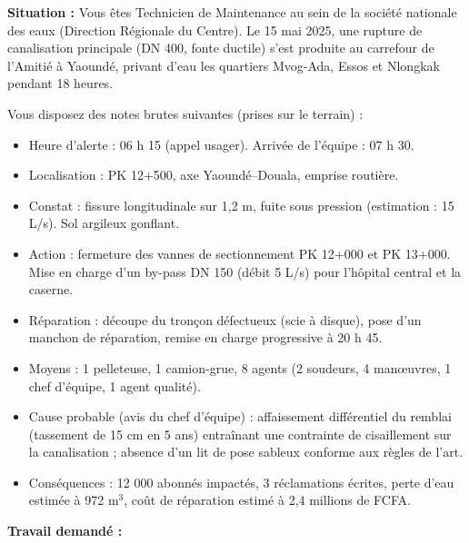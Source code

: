 \documentclass[11pt]{article}
\begin{document}
\begin{exercice}
\textbf{Situation :} Vous êtes Technicien de Maintenance au sein de la société nationale des eaux (Direction Régionale du Centre). Le 15 mai 2025, une rupture de canalisation principale (DN 400, fonte ductile) s'est produite au carrefour de l'Amitié à Yaoundé, privant d'eau les quartiers Mvog-Ada, Essos et Nlongkak pendant 18 heures.

Vous disposez des notes brutes suivantes (prises sur le terrain) :
\begin{itemize}
\item Heure d'alerte : 06 h 15 (appel usager). Arrivée de l'équipe : 07 h 30.
\item Localisation : PK 12+500, axe Yaoundé--Douala, emprise routière.
\item Constat : fissure longitudinale sur 1,2 m, fuite sous pression (estimation : 15 L/s). Sol argileux gonflant.
\item Action : fermeture des vannes de sectionnement PK 12+000 et PK 13+000. Mise en charge d'un by-pass DN 150 (débit 5 L/s) pour l'hôpital central et la caserne.
\item Réparation : découpe du tronçon défectueux (scie à disque), pose d'un manchon de réparation, remise en charge progressive à 20 h 45.
\item Moyens : 1 pelleteuse, 1 camion-grue, 8 agents (2 soudeurs, 4 manœuvres, 1 chef d'équipe, 1 agent qualité).
\item Cause probable (avis du chef d'équipe) : affaissement différentiel du remblai (tassement de 15 cm en 5 ans) entraînant une contrainte de cisaillement sur la canalisation ; absence d'un lit de pose sableux conforme aux règles de l'art.
\item Conséquences : 12 000 abonnés impactés, 3 réclamations écrites, perte d'eau estimée à 972 m$^3$, coût de réparation estimé à 2,4 millions de FCFA.
\end{itemize}

\textbf{Travail demandé :}


\end{exercice}
\end{document}
